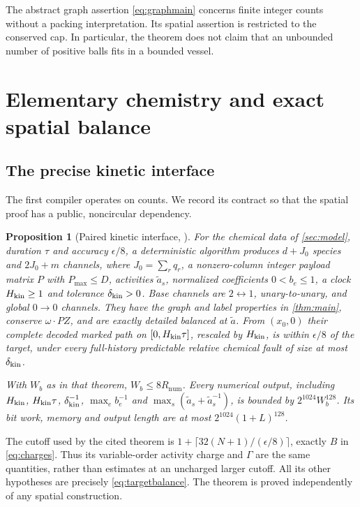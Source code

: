 \documentclass[11pt]{article}
\numberwithin{equation}{section}
\newtheorem{proposition}[theorem]{Proposition}
\theoremstyle{definition}
\theoremstyle{remark}\newtheorem{remark}[theorem]{Remark}
\newcommand{\Rnum}{R_{\mathrm{num}}}
\begin{document}
The abstract graph assertion \eqref{eq:graphmain} concerns finite integer
counts without a packing interpretation. Its spatial assertion is restricted
to the conserved cap. In particular, the theorem does not claim that an
unbounded number of positive balls fits in a bounded vessel.



\section{Elementary chemistry and exact spatial balance}
\label{sec:chemistry}

\subsection{The precise kinetic interface}

The first compiler operates on counts. We record its contract so that the
spatial proof has a public, noncircular dependency.

\begin{proposition}[Paired kinetic interface, {\cite[Theorem~9.1]{Sandhu2026}}]
\label{prop:kinetic}
For the chemical data of \cref{sec:model}, duration $\tau$ and accuracy
$\epsilon/8$, a deterministic algorithm produces $d+J_0$ species and
$2J_0+m$ channels, where $J_0=\sum_rq_r$, a nonzero-column integer payload
matrix $P$ with $P_{\max}\le D$, activities $\widetilde a_s$, normalized
coefficients $0<b_e\le1$, a clock $H_{\rm kin}\ge1$ and tolerance
$\delta_{\rm kin}>0$. Base channels are $2\leftrightarrow1$, unary-to-unary,
and global $0\to0$ channels. They have the graph and label properties in
\cref{thm:main}, conserve $\omega\cdot PZ$, and are exactly detailed balanced
at $\widetilde a$. From $(x_0,0)$ their complete decoded marked path on
$[0,H_{\rm kin}\tau]$, rescaled by $H_{\rm kin}$, is within $\epsilon/8$
of the target, under every full-history predictable relative chemical fault
of size at most $\delta_{\rm kin}$.

With $W_b$ as in that theorem, $W_b\le8\Rnum$. Every numerical output,
including $H_{\rm kin}$, $H_{\rm kin}\tau$, $\delta_{\rm kin}^{-1}$,
$\max_eb_e^{-1}$ and $\max_s(\widetilde a_s+\widetilde a_s^{-1})$,
is bounded by $2^{1024}W_b^{128}$. Its bit work, memory and output length
are at most $2^{1024}(1+L)^{128}$.
\end{proposition}

The cutoff used by the cited theorem is
$1+\lceil32(N+1)/(\epsilon/8)\rceil$, exactly $B$ in
\eqref{eq:charges}. Thus its variable-order activity charge and $\Gamma$
are the same quantities, rather than estimates at an uncharged larger
cutoff. All its other hypotheses are precisely \eqref{eq:targetbalance}.
The theorem is proved independently of any spatial construction.
\end{document}
